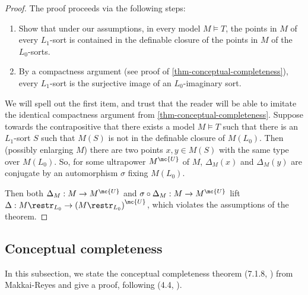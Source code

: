   \begin{proof}
    The proof proceeds via the following steps:
    \begin{enumerate}
    \item Show that under our assumptions, in every model $M \models T$, the points in $M$ of every $L_1$-sort is contained in the definable closure of the points in $M$ of the $L_0$-sorts.
    \item By a compactness argument (see proof of \ref{thm-conceptual-completeness}), every $L_1$-sort is the surjective image of an $L_0$-imaginary sort.
    \end{enumerate}

    We will spell out the first item, and trust that the reader will be able to imitate the identical compactness argument from \ref{thm-conceptual-completeness}. Suppose towards the contrapositive that there exists a model $M \models T$ such that there is an $L_1$-sort $S$ such that $M(S)$ is not in the definable closure of $M(L_0)$. Then (possibly enlarging $M$) there are two points $x,y \in M(S)$ with the same type over $M(L_0)$. So, for some ultrapower $M^{\mc{U}}$ of $M$, $\Delta_M(x)$ and $\Delta_M(y)$ are conjugate by an automorphism $\sigma$ fixing $M(L_0)$.

      Then both $\Delta_M : M \to M^{\mc{U}}$ and $\sigma \circ \Delta_M : M \to M^{\mc{U}}$ lift $\Delta : M \restr_{L_0} \to \left(M \restr_{L_0}\right)^{\mc{U}}$, which violates the assumptions of the theorem.
    \end{proof}
  
\subsection{Conceptual completeness}
In this subsection, we state the conceptual completeness theorem (7.1.8, \cite{makkai-reyes}) from Makkai-Reyes and give a proof, following (4.4, \cite{kamensky-categorical-internality}).


